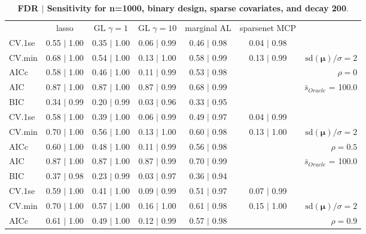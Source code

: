 \begin{table}\vspace{-.5cm}
\caption[l]{ {\it }
{ \bf FDR $\boldsymbol{\mid}$ Sensitivity for n=1000, binary design, sparse covariates, and  decay  200}.}
\vspace{-.5cm}
\footnotesize{}
\begin{center}
\begin{tabular}{l*{5}{c}|r}
 & lasso & GL $\gamma=1$ & GL $\gamma=10$ & marginal AL & sparsenet MCP  & \\
 \cline{1-7}
CV.1se & 0.55 $\mid$ 1.00 & 0.35 $\mid$ 1.00 & 0.06 $\mid$ 0.99 & 0.46 $\mid$ 0.98 & 0.04 $\mid$ 0.98 & \\
CV.min & 0.68 $\mid$ 1.00 & 0.54 $\mid$ 1.00 & 0.13 $\mid$ 1.00 & 0.58 $\mid$ 0.99 & 0.13 $\mid$ 0.99 &  $\mathrm{sd}(\mathbf{\mu})/\sigma=2$ \\
AICc & 0.58 $\mid$ 1.00 & 0.46 $\mid$ 1.00 & 0.11 $\mid$ 0.99 & 0.53 $\mid$ 0.98 & & $\rho=0$ \\
AIC & 0.87 $\mid$ 1.00 & 0.87 $\mid$ 1.00 & 0.87 $\mid$ 0.99 & 0.68 $\mid$ 0.99 & &  \multirow{2}{*}{$\bar{s}_{Oracle}$ = 100.0} \\
BIC & 0.34 $\mid$ 0.99 & 0.20 $\mid$ 0.99 & 0.03 $\mid$ 0.96 & 0.33 $\mid$ 0.95 & &  \\
 \hline 
CV.1se & 0.58 $\mid$ 1.00 & 0.39 $\mid$ 1.00 & 0.06 $\mid$ 0.99 & 0.49 $\mid$ 0.97 & 0.04 $\mid$ 0.99 & \\
CV.min & 0.70 $\mid$ 1.00 & 0.56 $\mid$ 1.00 & 0.13 $\mid$ 1.00 & 0.60 $\mid$ 0.98 & 0.13 $\mid$ 1.00 &  $\mathrm{sd}(\mathbf{\mu})/\sigma=2$ \\
AICc & 0.60 $\mid$ 1.00 & 0.48 $\mid$ 1.00 & 0.11 $\mid$ 0.99 & 0.56 $\mid$ 0.98 & & $\rho=0.5$ \\
AIC & 0.87 $\mid$ 1.00 & 0.87 $\mid$ 1.00 & 0.87 $\mid$ 0.99 & 0.70 $\mid$ 0.99 & &  \multirow{2}{*}{$\bar{s}_{Oracle}$ = 100.0} \\
BIC & 0.37 $\mid$ 0.98 & 0.23 $\mid$ 0.99 & 0.03 $\mid$ 0.97 & 0.36 $\mid$ 0.94 & &  \\
 \hline 
CV.1se & 0.59 $\mid$ 1.00 & 0.41 $\mid$ 1.00 & 0.09 $\mid$ 0.99 & 0.51 $\mid$ 0.97 & 0.07 $\mid$ 0.99 & \\
CV.min & 0.70 $\mid$ 1.00 & 0.57 $\mid$ 1.00 & 0.16 $\mid$ 1.00 & 0.61 $\mid$ 0.98 & 0.15 $\mid$ 1.00 &  $\mathrm{sd}(\mathbf{\mu})/\sigma=2$ \\
AICc & 0.61 $\mid$ 1.00 & 0.49 $\mid$ 1.00 & 0.12 $\mid$ 0.99 & 0.57 $\mid$ 0.98 & & $\rho=0.9$ \\

\end{tabular}
\end{center}
\end{table}
